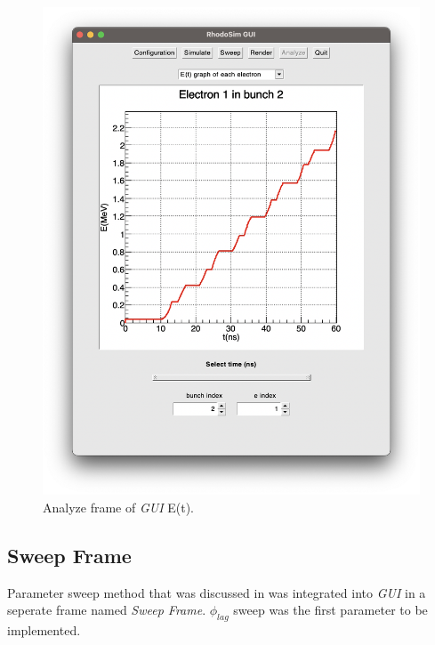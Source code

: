 \documentclass[a4paper,oneside,12pt]{report}
\numberwithin{equation}{chapter}
\begin{document}
\begin{figure}[h!]
    \centering
    \includegraphics[width=0.9\linewidth]{./figures/rhodoSim/GUI_analyze_Et_3.png}
    \caption{Analyze frame of \textit{GUI} E(t).}
    \label{fig:gui_analyze_Et}
    \vspace{20pt}
\end{figure}

\subsection{Sweep Frame}
Parameter sweep method that was discussed in  was integrated into \textit{GUI} in a seperate frame named \textit{Sweep Frame}.
$\phi_{lag}$ sweep was the first parameter to be implemented. 
\end{document}
